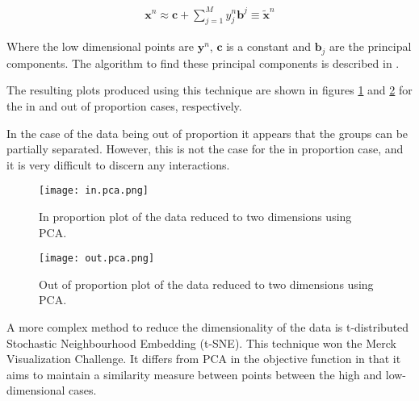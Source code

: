 
\begin{align}
    \pmb{x}^{n} \approx \pmb{c} + \sum_{j=1}^{M} y_{j}^{n} \pmb{b}^{j} \equiv \tilde{\pmb{x}}^{n}
\end{align}

Where the low dimensional points are $\pmb{y}^{n}$, $\pmb{c}$ is a constant and $\pmb{b}_{j}$ are the principal components.
The algorithm to find these principal components is described in \textcite[333]{barber_bayesian_2012}.

The resulting plots produced using this technique are shown in figures \ref{fig:inpca} and \ref{fig:outpca} for the in and out of proportion cases, respectively.

In the case of the data being out of proportion it appears that the groups can be partially separated.
However, this is not the case for the in proportion case, and it is very difficult to discern any interactions.

\begin{figure}
    \centering
    \texttt{[image: in.pca.png]}
    \caption{In proportion plot of the data reduced to two dimensions using \ac{PCA}.}
    \label{fig:inpca}
\end{figure}

\begin{figure}
    \texttt{[image: out.pca.png]}
    \centering
    \caption{Out of proportion plot of the data reduced to two dimensions using \ac{PCA}.}
    \label{fig:outpca}
\end{figure}


A more complex method to reduce the dimensionality of the data is t-distributed Stochastic Neighbourhood Embedding (t-SNE)\autocite{van_der_maaten_visualizing_2008}.
This technique won the Merck Visualization Challenge.   
It differs from \ac{PCA} in the objective function in that it aims to maintain a similarity measure between points between the high and low-dimensional cases.

